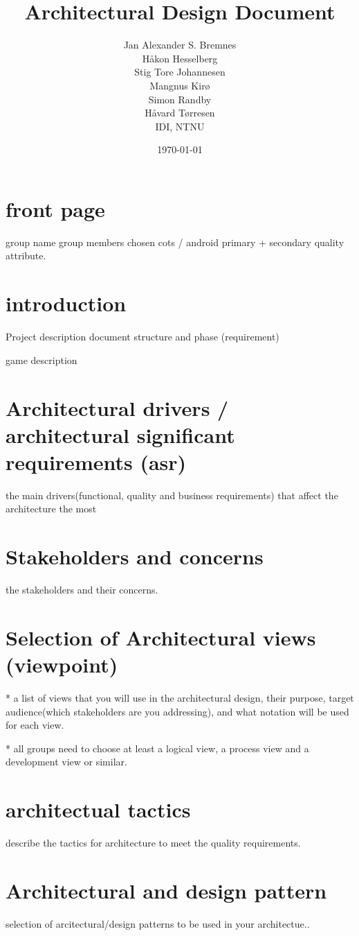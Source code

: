 \documentclass[12pt, a4paper]{article}
\title{Architectural Design Document}
\author{
	Jan Alexander S. Bremnes \\
	Håkon Hesselberg \\
	Stig Tore Johannesen \\
	Mangnus Kirø \\
	Simon Randby \\
	Håvard Tørresen \\
	IDI, NTNU
}
\date{\today}
\begin{document}
\maketitle
{}

\section{front page}
group name
group members
chosen cots / android
primary + secondary quality attribute. 

\section{introduction}
Project description
document structure and phase (requirement)

game description

\section{Architectural drivers / architectural significant requirements (asr)}
the main drivers(functional, quality and business requirements) that affect the architecture the most 

\section{Stakeholders and concerns}
the stakeholders and their concerns. 

\section{Selection of Architectural views (viewpoint)}
* a list of views that you will use in the architectural design, their purpose, target audience(which stakeholders are you addressing), and what notation will be used for each view. 

* all groups need  to choose at least a logical view, a process view and a development view or similar. 

\section{architectual tactics}
describe the tactics for architecture to meet the quality requirements. 

\section{Architectural and design pattern}
selection of arcitectural/design patterns to be used in your architectue..
\end{document}
